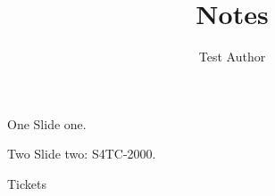 \documentclass[aspectratio=169,10pt]{beamer}
\title{Notes}
\author{Test Author}
\begin{document}
\begin{frame}{One}
	Slide one.
\end{frame}
\begin{frame}{Two}
	Slide two: \gls{S4TC-2000}.
\end{frame}
\begin{frame}[allowframebreaks]{Tickets}
	\printjiraglossary
\end{frame}
\end{document}
